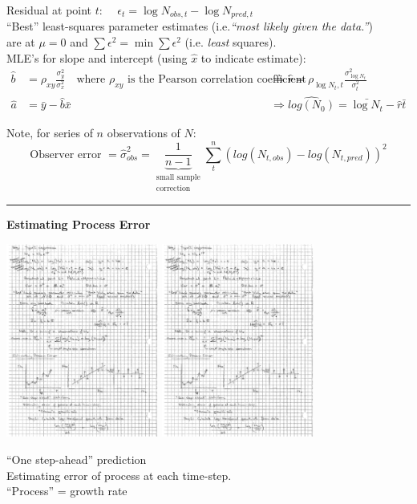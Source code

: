 \documentclass{article}
\newcommand{\ind}{\-\hspace{1cm}}
\begin{document}
Residual at point $t$: $\quad \epsilon_t = \log N_{obs,t} - \log N_{pred,t}$\\

``Best'' least-squares parameter estimates (i.e.\emph{``most likely given the data.''})\\
\ind are at $\mu = 0$ and $\sum\epsilon^2 = \min{\sum\epsilon^2}$ (i.e. \emph{least} squares).\\

MLE's for slope and intercept (using $\hat{x}$ to indicate estimate):
\begin{align*}
	\hat{b} &= \rho_{xy}\frac{\sigma^2_y}{\sigma^2_x} \quad \text{where } \rho_{xy} \text{ is the Pearson correlation coefficient} \quad &\Rightarrow \hat{r} = \rho_{\log N_t,t}\frac{ \sigma^2_{\log N_t}}{\sigma^2_t}\\
	\hat{a} &= \bar{y}-\hat{b}\bar{x} &\Rightarrow \widehat{log(N_0)} = \bar{\log N_t} - \hat{r} \bar{t}
\end{align*}

Note, for series of $n$ observations of $N$:
\begin{equation*}
\text{Observer error } = \hat{\sigma}_{obs}^2 = \underbrace{\frac{1}{n-1}}_{\substack{\text{small sample}\\ \text{correction}}} \sum_t^n\left(log(N_{t,obs}) - log(N_{t,pred})\right)^2
\end{equation*}

\rule[0.5ex]{\linewidth}{1pt}

\textbf{Estimating Process Error}
\begin{center}
	\includegraphics[width=5cm]{figs/image2a.pdf}
	\includegraphics[width=5cm]{figs/image2b.pdf}
\end{center}
``One step-ahead'' prediction\\
\ind Estimating error of process at each time-step.\\
\ind \ind ``Process'' = growth rate\\
\end{document}
